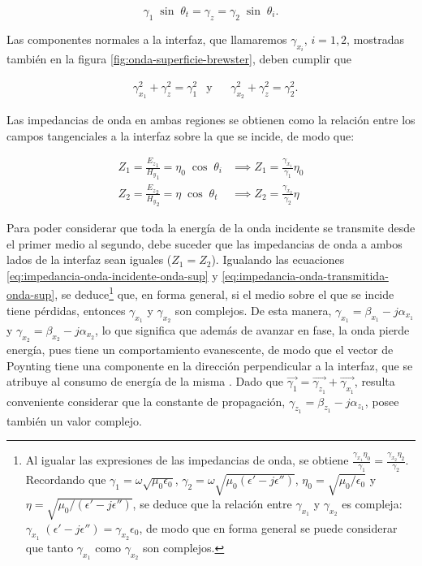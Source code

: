 \begin{equation}
	\gamma_{1} \; \sin \; \theta_t = \gamma_{z} = \gamma_2 \; \sin \; \theta_i.
\end{equation}

Las componentes normales a la interfaz, que llamaremos $\gamma_{x_i}$, $i=1,2$, mostradas también en la figura \ref{fig:onda-superficie-brewster}, deben cumplir que

\begin{align}
	\label{eq:condicion-componentes-normales-ondas-superficie}
	& \gamma_{x_1}^2 + \gamma_z^2 = \gamma_1^2 &\text{y} &&\gamma_{x_2}^2 + \gamma_z^2 = \gamma_2^2.
\end{align}

Las impedancias de onda en ambas regiones se obtienen como la relación entre los campos tangenciales a la interfaz sobre la que se incide, de modo que:

\begin{subequations}
\label{eq:impedancia-onda-superficie}
\begin{align}
	Z_1 = \frac{{E_z}_1}{{H_y}_1} = \eta_0 \; \cos\; \theta_i &\implies Z_1 = \frac{\gamma_{x_1}}{\gamma_1} \eta_0 \label{eq:impedancia-onda-incidente-onda-sup}\\
	Z_2 = \frac{{E_z}_2}{{H_y}_2} = \eta \; \cos \; \theta_t &\implies Z_2 = \frac{\gamma_{x_2}}{\gamma_2} \eta \label{eq:impedancia-onda-transmitida-onda-sup}
\end{align}
\end{subequations}

Para poder considerar que toda la energía de la onda incidente se transmite desde el primer medio al segundo, debe suceder que las impedancias de onda a ambos lados de la interfaz sean iguales ($Z_1 = Z_2$). Igualando las ecuaciones \ref{eq:impedancia-onda-incidente-onda-sup} y \ref{eq:impedancia-onda-transmitida-onda-sup}, se deduce\footnote{Al igualar las expresiones de las impedancias de onda, se obtiene $\frac{\gamma_{x_1} \eta_0}{\gamma_1} = \frac{\gamma_{x_2} \eta_2}{\gamma_2}$. Recordando que $\gamma_1=\omega \sqrt{\mu_0 \epsilon_0}$, $\gamma_2=\omega \sqrt{\mu_0 (\epsilon'-j\epsilon'')}$, $\eta_0 = \sqrt{\mu_0 / \epsilon_0}$ y $\eta = \sqrt{\mu_0 / (\epsilon'-j\epsilon'')}$, se deduce que la relación entre $\gamma_{x_1}$ y $\gamma_{x_2}$ es compleja: $\gamma_{x_1}\; (\epsilon' - j \epsilon'') = \gamma_{x_2} \epsilon_0$, de modo que en forma general se puede considerar que tanto $\gamma_{x_1}$ como $\gamma_{x_2}$ son complejos.} que, en forma general, si el medio sobre el que se incide tiene pérdidas, entonces $\gamma_{x_1}$ y $\gamma_{x_2}$ son complejos. De esta manera, $\gamma_{x_1} = \beta_{x_1} - j\alpha_{x_1}$ y $\gamma_{x_2} = \beta_{x_2} - j\alpha_{x_2}$, lo que significa que además de avanzar en fase, la onda pierde energía, pues tiene un comportamiento evanescente, de modo que el vector de Poynting tiene una componente en la dirección perpendicular a la interfaz, que se atribuye al consumo de energía de la misma \cite{Barlow:SurfaceWaves}. Dado que $\vec{\gamma_1} = \vec{\gamma_{z_1}} + \vec{\gamma_{x_1}}$, resulta conveniente considerar que la constante de propagación, $\gamma_{z_1} = \beta_{z_1} - j \alpha_{z_1}$, posee también un valor complejo.

